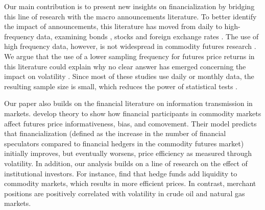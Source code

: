 \documentclass[12pt]{article}
\begin{document}
Our main contribution is to present new insights on financialization by bridging this line of research with the macro announcements literature. To better identify the impact of announcements, this literature has moved from daily to high-frequency data, examining bonds  \citep*{andersen2007real, hu2013noise, balduzzi2001economic,lee1995oil, hautsch2011impact, kurov2019price}, stocks \citep*{andersen2007real,bernile2016can,kurov2019price} and foreign exchange rates \citep*{lee1995oil,andersen2003micro}. The use of high frequency data, however, is not widespread in commodity futures research \citep*{couleau2020corn}. We argue that the use of a lower sampling frequency for futures price returns in this literature could explain why no clear answer has emerged concerning the impact on volatility \citep*{tang2012index,brunetti2016speculators,irwin2012testing,stoll2010commodity,alquist2013role}. Since most of these studies use daily or monthly data, the resulting sample size is small, which reduces the power of statistical tests \citep*{irwin2009devil}.  



Our paper also builds on the financial literature on information transmission in markets. \citet*{goldstein2022commodity} develop theory to show how financial participants in commodity markets affect futures price informativeness, bias, and comovement. Their model predicts that financialization (defined as the increase in the number of financial speculators compared to financial hedgers in the commodity futures market) initially improves, but eventually worsens, price efficiency as measured through volatility. In addition, our analysis builds on a line of research on the effect of institutional investors. For instance,  \citet*{brunetti2016speculators} find that hedge funds add  liquidity to commodity markets, which results in more efficient prices. In contrast, merchant positions are positively correlated with volatility in crude oil and natural gas markets. 
\end{document}
